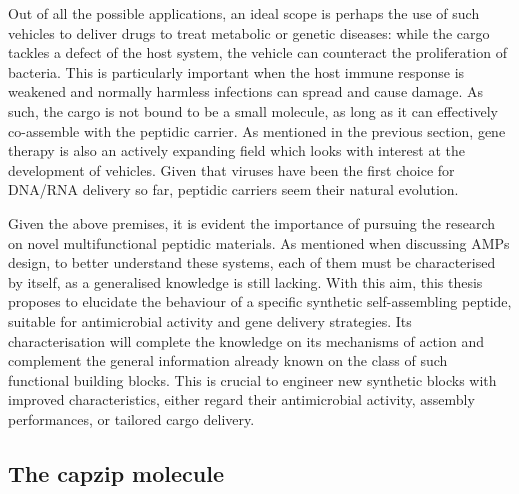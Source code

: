 Out of all the possible applications, an ideal scope is perhaps the use of such vehicles to deliver drugs to treat metabolic or genetic diseases: while the cargo tackles a defect of the host system, the vehicle can counteract the proliferation of bacteria. This is particularly important when the host immune response is weakened and normally harmless infections can spread and cause damage.
%
As such, the cargo is not bound to be a small molecule, as long as it can effectively co-assemble with the peptidic carrier. As mentioned in the previous section, gene therapy is also an actively expanding field which looks with interest at the development of vehicles. Given that viruses have been the first choice for DNA/RNA delivery so far, peptidic carriers seem their natural evolution.

Given the above premises, it is evident the importance of pursuing the research on novel multifunctional peptidic materials.
%
As mentioned when discussing AMPs design, to better understand these systems, each of them must be characterised by itself, as a generalised knowledge is still lacking.
With this aim, this thesis proposes to elucidate the behaviour of a specific synthetic self-assembling peptide, suitable for antimicrobial activity and gene delivery strategies.
%
Its characterisation will complete the knowledge on its mechanisms of action and complement the general information already known on the class of such functional building blocks. This is crucial to engineer new synthetic blocks with improved characteristics, either regard their antimicrobial activity, assembly performances, or tailored cargo delivery.


\subsection{The capzip molecule} \label{sec:capzip}

